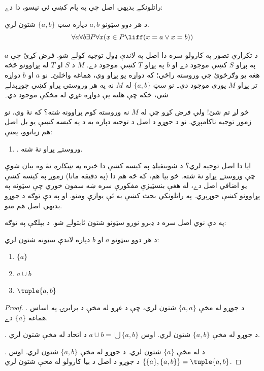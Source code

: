 \documentclass[../../../include/open-logic-section]{subfiles}
\begin{document}

راتلونکے بديهي اصل چې په پام کښې ئې نيسو، دا دے:

\begin{axiom}[جوړې]
د هر دوو سټونو $a, b$ دپاره سټ $\{a, b\}$ شتون لري.
\[
	\forall a \forall b \exists P \forall x (x \in P \liff (x = a \lor x = b))
\]
\end{axiom}

د تکراري تصور په کارولو سره دا اصل په لاندې ډول توجيه کولے شو.
فرض کړئ چې $a$ په پړاو $S$ کښې موجود دے او $b$ په پړاو $T$
کښې موجود دے. $M$ د $S$ او $T$ له پړاوونو څخه هغه يو وګرځوئ
چې وروسته راځي؛ که دواړه يو پړاو وي، هماغه واخلئ۔ نو
$a$ او $b$ دواړه تر پړاو $M$ پورې موجود دي۔ نو سټ
$\{a,b\}$ له $M$ نه په هر وروستي پړاو کښې جوړېدلے شي،
ځکه چې هلته يې دواړه غړي له مخکې موجود دي۔

خو لږ تم شئ!{} ولې فرض کړو چې له $M$ نه وروسته کوم پړاوونه
\emph{شته}؟ که نۀ وي، نو زموږ توجيه ناکامېږي. نو د جوړو د اصل
د توجيه دپاره به د  په کيسه کښې يو بل
اصل هم زياتوو، يعنې:
\begin{enumerate}
	\item[] \stagessucc. وروستے پړاو نۀ شته.
\end{enumerate}
ايا دا اصل توجيه لري؟ د شوينفيلډ په کيسه کښې دا خبره
\emph{په ښکاره} نۀ وه بيان شوې چې وروستے پړاو نۀ شته.
خو بيا هم، که څه هم دا (په دقيقه مانا) زموږ په کيسه کښې يو
اضافي اصل دے، له هغې بنسټيزې مفکورې سره ښه سمون خوري چې
سټونه په پړاوونو کښې جوړېږي. په راتلونکي بحث کښې به ئې
يوازې ومنو. او په دې توګه د جوړو بديهي اصل هم منو.

په دې نوي اصل سره د ډېرو نورو سټونو شتون ثابتولے شو. د بېلګې په توګه:

\begin{prop}
د هر دوو سټونو $a$ او $b$ دپاره لاندې سټونه شتون لري:
	\begin{enumerate}
		\item{} $\{a\}$
		\item{} $a \cup b$
		\item{} $\tuple{a, b}$
	\end{enumerate}
\end{prop}

\begin{proof}
. د جوړو له مخې $\{a, a\}$ شتون لري، چې د
غړو له مخې د برابرۍ په اساس هماغه $\{a\}$ دے.

. د جوړو له مخې $\{a, b\}$ شتون لري. اوس
$a \cup b = \bigcup
\{a, b\}$ د اتحاد له مخې شتون لري.

. د  له مخې $\{a\}$ شتون لري.
د جوړو له مخې $\{a,
b\}$ شتون لري. اوس $\{\{a\}, \{a, b\}\} = \tuple{a, b}$
د جوړو د اصل د بيا کارولو له مخې شتون لري.
\end{proof}
\end{document}
